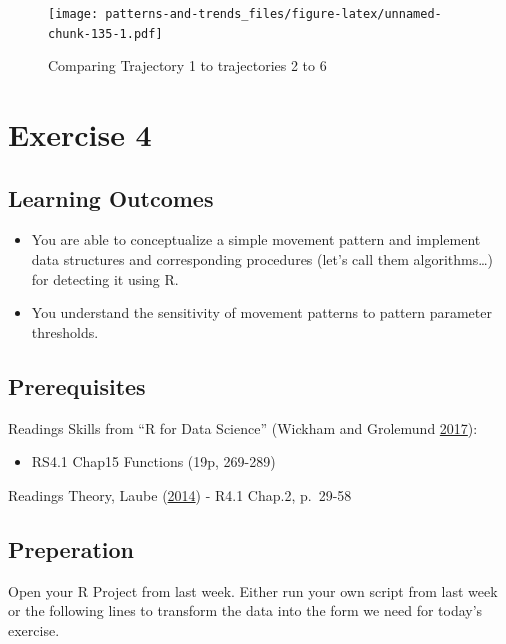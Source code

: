 \documentclass[]{book}
\providecommand{\tightlist}{%
  \setlength{\itemsep}{0pt}\setlength{\parskip}{0pt}}
\begin{document}
\begin{figure}
\centering
\texttt{[image: patterns-and-trends\_files/figure-latex/unnamed-chunk-135-1.pdf]}
\caption{\label{fig:unnamed-chunk-135}Comparing Trajectory 1 to trajectories 2 to 6}
\end{figure}

\hypertarget{exercise-4}{%
\chapter{Exercise 4}\label{exercise-4}}

\hypertarget{learning-outcomes-2}{%
\section{Learning Outcomes}\label{learning-outcomes-2}}

\begin{itemize}
\tightlist
\item
  You are able to conceptualize a simple movement pattern and implement data structures and corresponding procedures (let's call them algorithms\ldots{}) for detecting it using R.
\item
  You understand the sensitivity of movement patterns to pattern parameter thresholds.
\end{itemize}

\hypertarget{prerequisites-3}{%
\section{Prerequisites}\label{prerequisites-3}}

Readings Skills from ``R for Data Science'' (Wickham and Grolemund \protect\hyperlink{ref-wickham2017}{2017}):

\begin{itemize}
\tightlist
\item
  RS4.1 Chap15 Functions (19p, 269-289)
\end{itemize}

Readings Theory, Laube (\protect\hyperlink{ref-laube2014}{2014})
- R4.1 Chap.2, p.~29-58

\hypertarget{preperation-3}{%
\section{Preperation}\label{preperation-3}}

Open your R Project from last week. Either run your own script from last week or the following lines to transform the data into the form we need for today's exercise.
\end{document}
